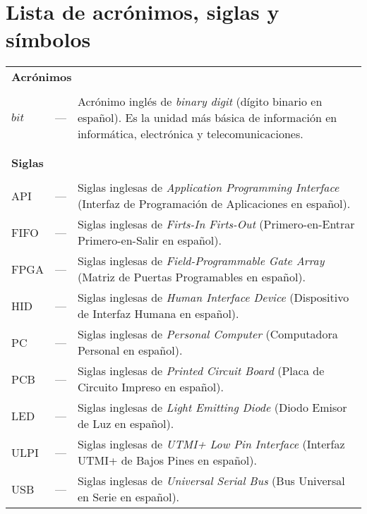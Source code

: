 \chapter*{Lista de acrónimos, siglas y símbolos}
\label{LDS}

\begin{longtable}{lcp{} }

\multicolumn{3}{l}{\textbf{Acrónimos}}\\
\\
$bit$ & --- & Acrónimo inglés de \textit{binary digit} (dígito binario en español). Es la unidad más básica de información en informática, electrónica y telecomunicaciones.\\

\\
\\

\multicolumn{3}{l}{\textbf{Siglas}}\\
\\
API & --- & Siglas inglesas de \textit{Application Programming Interface} (Interfaz de Programación de Aplicaciones en español).\\

FIFO & --- & Siglas inglesas de \textit{Firts-In Firts-Out} (Primero-en-Entrar Primero-en-Salir en español).\\

FPGA & --- & Siglas inglesas de \textit{Field-Programmable Gate Array} (Matriz de Puertas Programables en español).\\

HID & --- & Siglas inglesas de \textit{Human Interface Device} (Dispositivo de Interfaz Humana en español).\\

PC & --- & Siglas inglesas de \textit{Personal Computer} (Computadora Personal en español).\\

PCB & --- & Siglas inglesas de \textit{Printed Circuit Board} (Placa de Circuito Impreso en español).\\

LED & --- & Siglas inglesas de \textit{Light Emitting Diode} (Diodo Emisor de Luz en español).\\

ULPI & --- & Siglas inglesas de \textit{UTMI+ Low Pin Interface} (Interfaz UTMI+ de Bajos Pines en español).\\

USB & --- & Siglas inglesas de \textit{Universal Serial Bus} (Bus Universal en Serie en español).\\


\end{longtable}
